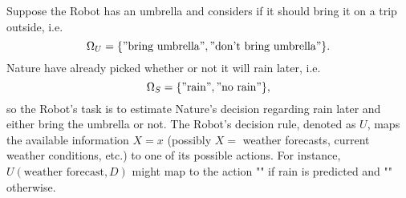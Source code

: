 \begin{example}
	\label{ex:rain}
	Suppose the Robot has an umbrella and considers if it should bring it on a trip outside, i.e.
	\begin{equation}
		\Omega_U = \{"\text{bring umbrella}", "\text{don't bring umbrella}"\}.
	\end{equation}
	Nature have already picked whether or not it will rain later, i.e.
	\begin{equation}
		\Omega_S = \{"\text{rain}", "\text{no rain}"\},
	\end{equation}
	so the Robot's task is to estimate Nature's decision regarding rain later and either bring the umbrella or not. The Robot's decision rule, denoted as $U$, maps the available information $X=x$ (possibly $X=$ weather forecasts, current weather conditions, etc.) to one of its possible actions. For instance, $U(\text{weather forecast}, D)$ might map to the action "" if rain is predicted and "" otherwise.
\end{example}

